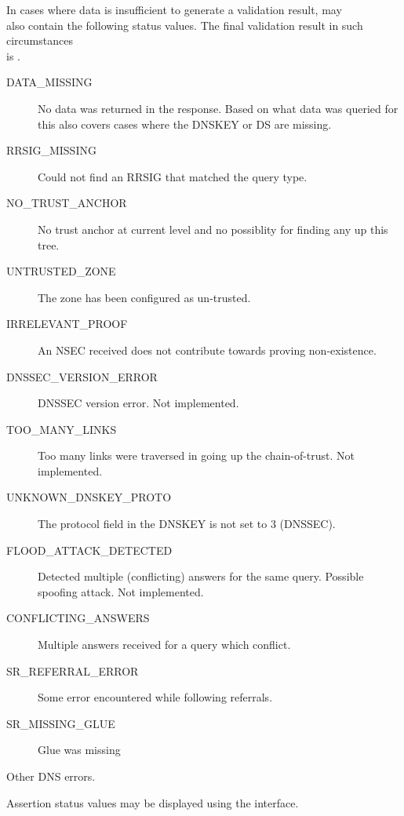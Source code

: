                                                                                                                              

In cases where data is insufficient to generate a validation result,  may \\ 
also contain the following status values. The final validation result in such circumstances \\
is .

                                                                                                                             
\begin{description}
\item[DATA\_MISSING]  No data was returned in the response. Based on what data was queried for this also covers cases where the DNSKEY or DS are missing. 
\item[RRSIG\_MISSING] Could not find an RRSIG that matched the query type. 
\item[NO\_TRUST\_ANCHOR] No trust anchor at current level and no possiblity for finding any up this tree.  
\item[UNTRUSTED\_ZONE] The zone has been configured as un-trusted. 
\item[IRRELEVANT\_PROOF] An NSEC received does not contribute towards proving non-existence.
\item[DNSSEC\_VERSION\_ERROR] DNSSEC version error. Not implemented. 
\item[TOO\_MANY\_LINKS] Too many links were traversed in going up the chain-of-trust.  Not implemented. 
\item[UNKNOWN\_DNSKEY\_PROTO] The protocol field in the DNSKEY is not set to 3 (DNSSEC). 
\item[FLOOD\_ATTACK\_DETECTED] Detected multiple (conflicting) answers for the same query.  Possible spoofing attack. Not implemented. 
\item[CONFLICTING\_ANSWERS] Multiple answers received for a query which conflict. 
\item[SR\_REFERRAL\_ERROR] Some error encountered while following referrals.
\item[SR\_MISSING\_GLUE] Glue was missing 
\item[Other DNS errors.] 
\end{description}


                                                                                                                             
Assertion status values may be displayed using the  interface.


